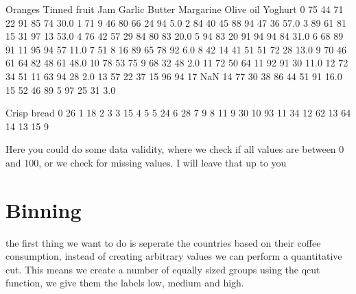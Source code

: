 \documentclass[letterpaper,10pt,english]{jupyterBook}
\begin{document}
\begin{sphinxVerbatim}[commandchars=\\\{\}]
    Oranges  Tinned fruit  Jam  Garlic  Butter  Margarine  Olive oil  Yoghurt  \PYGZbs{}
0        75            44   71      22      91         85         74     30.0   
1        71             9   46      80      66         24         94      5.0   
2        84            40   45      88      94         47         36     57.0   
3        89            61   81      15      31         97         13     53.0   
4        76            42   57      29      84         80         83     20.0   
5        94            83   20      91      94         94         84     31.0   
6        68            89   91      11      95         94         57     11.0   
7        51             8   16      89      65         78         92      6.0   
8        42            14   41      51      51         72         28     13.0   
9        70            46   61      64      82         48         61     48.0   
10       78            53   75       9      68         32         48      2.0   
11       72            50   64      11      92         91         30     11.0   
12       72            34   51      11      63         94         28      2.0   
13       57            22   37      15      96         94         17      NaN   
14       77            30   38      86      44         51         91     16.0   
15       52            46   89       5      97         25         31      3.0   

    Crisp bread  
0            26  
1            18  
2             3  
3            15  
4             5  
5            24  
6            28  
7             9  
8            11  
9            30  
10           93  
11           34  
12           62  
13           64  
14           13  
15            9  
\end{sphinxVerbatim}

\sphinxAtStartPar
Here you could do some data validity, where we check if all values are between 0 and 100, or we check for missing values.
I will leave that up to you


\section{Binning}
\label{\detokenize{c2_data_preparation/binning_ranking:binning}}
\sphinxAtStartPar
the first thing we want to do is seperate the countries based on their coffee consumption, instead of creating arbitrary values we can perform a quantitative cut.
This means we create a number of equally sized groups using the qcut function, we give them the labels low, medium and high.
\end{document}
